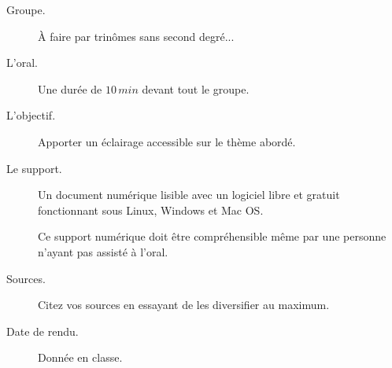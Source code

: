 \begin{description}
	\item[Groupe.] À faire par trinômes sans second degré...

	\item[L'oral.] Une durée de $10\,min$ devant tout le groupe.

	\item[L'objectif.] Apporter un éclairage accessible sur le thème abordé.

	\item[Le support.] Un document numérique lisible avec un logiciel libre et gratuit fonctionnant sous Linux, Windows et Mac OS.

	Ce support numérique doit être compréhensible même par une personne n'ayant pas assisté à l'oral.

	\item[Sources.] Citez vos sources en essayant de les diversifier au maximum.

	\item[Date de rendu.] Donnée en classe.
\end{description}

